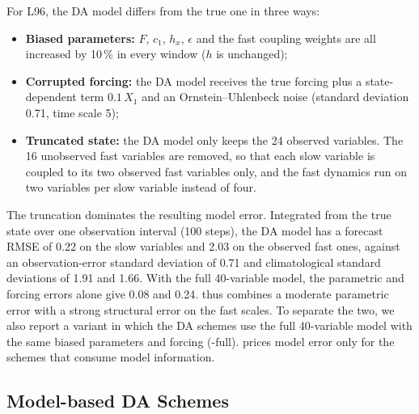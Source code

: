 For L96, the \So{} DA model differs from the true one in three ways:
\begin{itemize}[leftmargin=*,nosep]
  \item \textbf{Biased parameters:} $F$, $c_1$, $h_x$, $\epsilon$ and the fast coupling
    weights are all increased by 10\,\% in every window ($h$ is unchanged);
  \item \textbf{Corrupted forcing:} the DA model receives the true forcing plus a
    state-dependent term $0.1\,X_1$ and an Ornstein--Uhlenbeck noise (standard deviation
    0.71, time scale 5);
  \item \textbf{Truncated state:} the DA model only keeps the 24 observed variables. The
    16 unobserved fast variables are removed, so that each slow variable is coupled to its
    two observed fast variables only, and the fast dynamics run on two variables per slow
    variable instead of four.
\end{itemize}
The truncation dominates the resulting model error. Integrated from the true state over
one observation interval (100 steps), the \So{} DA model has a forecast RMSE of 0.22 on
the slow variables and 2.03 on the observed fast ones, against an observation-error
standard deviation of 0.71 and climatological standard deviations of 1.91 and 1.66. With
the full 40-variable model, the parametric and forcing errors alone give 0.08 and 0.24.
\So{} thus combines a moderate parametric error with a strong structural error on the
fast scales. To separate the two, we also report a variant in which the DA schemes use the
full 40-variable model with the same biased parameters and forcing (\So-full).
\So{} prices model error only for the schemes that consume model information.

\subsection{Model-based DA Schemes}

